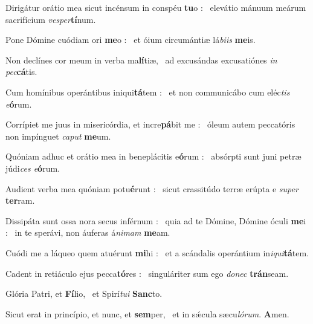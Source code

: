 \documentclass[12pt]{article} %
\def\noinitial{%
\gresetfirstlineaboveinitial{\textcolor{benred8}{\small \textsc{\textbf{}}}}{\textcolor{benred8}{\small \textsc{\textbf{}}}}
\setspaceafterinitial{0pt plus 0em minus 0em}%
\setspacebeforeinitial{0pt plus 0em minus 0em}%
\relax %
}
\newenvironment{psalmtext}{\leftskip 0.25in}{\vspace{2 mm}}
\let\oldgresixstar\gresixstar
\renewcommand{\gresixstar}{\textcolor{benred8}{\oldgresixstar}}
\let\oldgredagger\gredagger
\renewcommand{\gredagger}{\textcolor{benred8}{\oldgredagger}}
\begin{document}
\begin{psalmtext}
Dirigátur orátio mea sicut incénsum in conspéu \textbf{tu}o : \gresixstar\ elevátio mánuum meárum sacrifícium \emph{vesper}\textbf{tí}num.

Pone Dómine cuódiam ori \textbf{me}o : \gresixstar\ et óium circumántiæ lá\emph{biis} \textbf{me}is.

Non declínes cor meum in verba ma\textbf{lí}tiæ, \gresixstar\ ad excusándas excusatiónes \emph{in pec}\textbf{cá}tis.

Cum homínibus operántibus iniqui\textbf{tá}tem : \gresixstar\ et non communicábo cum eléc\emph{tis e}\textbf{ó}rum.

Corrípiet me juus in misericórdia, et incre\textbf{pá}bit me : \gresixstar\ óleum autem peccatóris non impínguet \emph{caput} \textbf{me}um.

Quóniam adhuc et orátio mea in beneplácitis e\textbf{ó}rum : \gresixstar\ absórpti sunt juni petræ júdi\emph{ces e}\textbf{ó}rum.

Audient verba mea quóniam potu\textbf{é}runt : \gresixstar\ sicut crassitúdo terræ erúpta e \emph{super} \textbf{ter}ram.

Dissipáta sunt ossa nora secus inférnum : \gredagger\ quia ad te Dómine, Dómine óculi \textbf{me}i : \gresixstar\ in te sperávi, non áuferas á\emph{nimam} \textbf{me}am.

Cuódi me a láqueo quem atuérunt \textbf{mi}hi : \gresixstar\ et a scándalis operántium in\emph{iqui}\textbf{tá}tem.

Cadent in retiáculo ejus pecca\textbf{tó}res : \gresixstar\ singuláriter sum ego \emph{donec} \textbf{trán}seam.

Glória Patri, et \textbf{Fí}lio, \gresixstar\ et Spirí\emph{tui} \textbf{Sanc}to.

Sicut erat in princípio, et nunc, et \textbf{sem}per, \gresixstar\ et in sǽcula sæcu\emph{lórum}. \textbf{A}men.

\end{psalmtext}

{\noinitial
{}

}

\vspace{2 mm}


\subsection*{}
\end{document}
